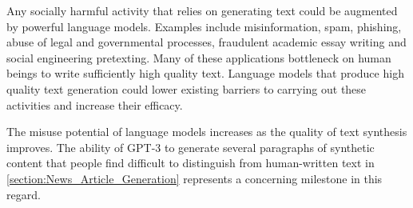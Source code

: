 Any socially harmful activity that relies on generating text could be augmented by powerful language models. Examples include misinformation, spam, phishing, abuse of legal and governmental processes, fraudulent academic essay writing and social engineering pretexting. Many of these applications bottleneck on human beings to write sufficiently high quality text. Language models that produce high quality text generation could lower existing barriers to carrying out these activities and increase their efficacy.

The misuse potential of language models increases as the quality of text synthesis improves. The ability of GPT-3 to generate several paragraphs of synthetic content that people find difficult to distinguish from human-written text in \ref{section:News_Article_Generation} represents a concerning milestone in this regard.